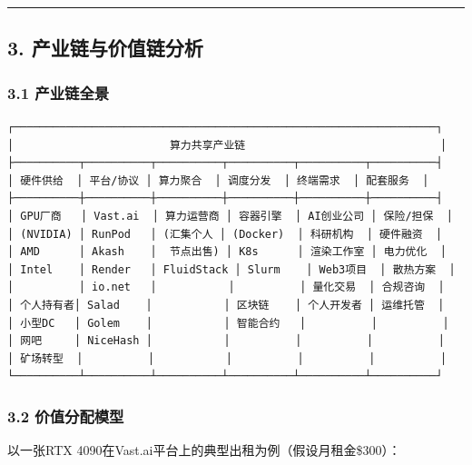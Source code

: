 \documentclass[UTF8,a4paper,12pt]{ctexart}
\begin{document}
\begin{center}\rule{0.5\linewidth}{0.5pt}\end{center}

\pagebreak

\subsection{3.
产业链与价值链分析}\label{ux4ea7ux4e1aux94feux4e0eux4ef7ux503cux94feux5206ux6790}

\subsubsection{3.1 产业链全景}\label{ux4ea7ux4e1aux94feux5168ux666f}

\begin{verbatim}
┌─────────────────────────────────────────────────────────────────┐
│                        算力共享产业链                              │
├──────────┬──────────┬──────────┬──────────┬──────────┬──────────┤
│ 硬件供给  │ 平台/协议 │ 算力聚合  │ 调度分发  │ 终端需求  │ 配套服务  │
├──────────┼──────────┼──────────┼──────────┼──────────┼──────────┤
│ GPU厂商   │ Vast.ai  │ 算力运营商 │ 容器引擎  │ AI创业公司 │ 保险/担保  │
│ (NVIDIA) │ RunPod   │ (汇集个人 │ (Docker)  │ 科研机构  │ 硬件融资  │
│ AMD      │ Akash    │  节点出售) │ K8s      │ 渲染工作室 │ 电力优化  │
│ Intel    │ Render   │ FluidStack │ Slurm    │ Web3项目  │ 散热方案  │
│          │ io.net   │           │          │ 量化交易  │ 合规咨询  │
│ 个人持有者│ Salad    │           │ 区块链    │ 个人开发者 │ 运维托管  │
│ 小型DC   │ Golem    │           │ 智能合约   │          │          │
│ 网吧     │ NiceHash │           │          │          │          │
│ 矿场转型  │          │           │          │          │          │
└──────────┴──────────┴──────────┴──────────┴──────────┴──────────┘
\end{verbatim}

\subsubsection{3.2
价值分配模型}\label{ux4ef7ux503cux5206ux914dux6a21ux578b}

以一张RTX 4090在Vast.ai平台上的典型出租为例（假设月租金\$300）：
\end{document}
